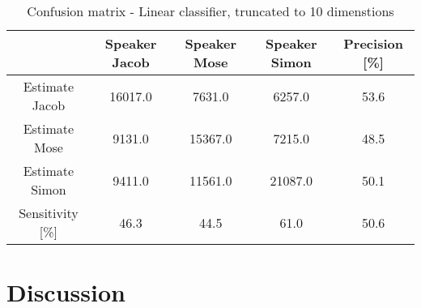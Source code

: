 \begin{table}[H]                                                           
\centering                                                                 
\begin{tabular}{|c|c|c|c|c|}                                               
\hline                                                                     
  & Speaker Jacob & Speaker Mose & Speaker Simon & Precision [\%] \\       
\hline                                                                     
Estimate Jacob & 16017.0 & 7631.0 & 6257.0 & 53.6 \\                       
\hline                                                                     
Estimate Mose & 9131.0 & 15367.0 & 7215.0 & 48.5 \\                        
\hline                                                                     
Estimate Simon & 9411.0 & 11561.0 & 21087.0 & 50.1 \\                      
\hline                                                                     
Sensitivity [\%] & 46.3 & 44.5 & 61.0 & 50.6 \\                            
\hline                                                                     
\end{tabular}                                                              
\caption{Confusion matrix - Linear classifier, truncated to 10 dimenstions}
\label{table:Lin_conf_10_trunc}                                            
\end{table} 
\section{Discussion}

